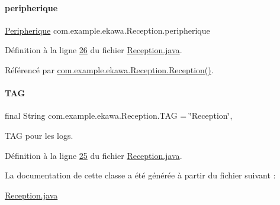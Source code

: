 \paragraph{\texorpdfstring{peripherique}{peripherique}}
{\footnotesize\ttfamily \hyperlink{classcom_1_1example_1_1ekawa_1_1_peripherique}{Peripherique} com.\+example.\+ekawa.\+Reception.\+peripherique\hspace{0.3cm}{\ttfamily [private]}}



Définition à la ligne \hyperlink{_reception_8java_source_l00026}{26} du fichier \hyperlink{_reception_8java_source}{Reception.\+java}.



Référencé par \hyperlink{_reception_8java_source_l00033}{com.\+example.\+ekawa.\+Reception.\+Reception()}.

\mbox{\label{classcom_1_1example_1_1ekawa_1_1_reception_a4e155d4690591616f1064e17764df72b}} 
\paragraph{\texorpdfstring{T\+AG}{TAG}}
{\footnotesize\ttfamily final String com.\+example.\+ekawa.\+Reception.\+T\+AG = \char`\"{}Reception\char`\"{}\hspace{0.3cm}{\ttfamily [static]}, {\ttfamily [private]}}



T\+AG pour les logs. 



Définition à la ligne \hyperlink{_reception_8java_source_l00025}{25} du fichier \hyperlink{_reception_8java_source}{Reception.\+java}.



La documentation de cette classe a été générée à partir du fichier suivant \+:\begin{DoxyCompactItemize}
\item 
\hyperlink{_reception_8java}{Reception.\+java}\end{DoxyCompactItemize}
